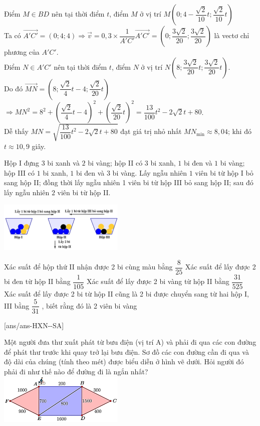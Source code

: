 \begin{ex}
{\begin{itemchoice}
     Điểm $M\in BD$ nên tại thời điểm $t$, điểm $M$ ở vị trí $M\left( 0;4-\dfrac{\sqrt{2}}{10}t;\dfrac{\sqrt{2}}{10}t \right)$\\
     Ta có $\vec{A'C'}=(0;4;4)\Rightarrow \vec{v}=0{,}3\times \dfrac{1}{A'C'}\vec{A'C'}=\left(0;\dfrac{3\sqrt{2}}{20};\dfrac{3\sqrt{2}}{20}\right)$ là vectơ chỉ phương của $A'C'$.\\
     Điểm $N\in A'C'$ nên tại thời điểm $t$, điểm $N$ ở vị trí $N\left(8;\dfrac{3\sqrt{2}}{20}t;\dfrac{3\sqrt{2}}{20}t\right)$.\\
     Do đó $\vec{MN}=\left(8;\dfrac{\sqrt{2}}{4}t-4;\dfrac{\sqrt{2}}{20}t\right)$\\
     $\Rightarrow MN^2=8^2+\left(\dfrac{\sqrt{2}}{4}t-4\right)^2+\left(\dfrac{\sqrt{2}}{20}t\right)^2=\dfrac{13}{100}t^2-2\sqrt{2}t+80$.\\
     Dễ thấy $MN=\sqrt{\dfrac{13}{100}t^2-2\sqrt{2}t+80}$ đạt giá trị nhỏ nhất $MN_{\min }\approx 8{,}04$; khi đó $t\approx 10{,}9$  giây.
     \end{itemchoice}
 }
\end{ex}
\begin{ex}%
Hộp I đựng $3$ bi xanh và $2$ bi vàng; hộp II có $3$ bi xanh, $1$ bi đen và $1$ bi vàng; hộp III có $1$ bi xanh, $1$ bi đen và $3$ bi vàng. Lấy ngẫu nhiên $1$ viên bi từ hộp I bỏ sang hộp II; đồng thời lấy ngẫu nhiên 1 viên bi từ hộp III bỏ sang hộp II; sau đó lấy ngẫu nhiên $2$ viên bi từ hộp II.\\
\centerline{
\includegraphics[width=6cm]{img/HXN-8-16}
}
 \choiceTF
 {Xác suất để hộp thứ II nhận được 2 bi cùng màu bằng $\dfrac{8}{25}$}
 {\True Xác suất để lấy được 2 bi đen từ hộp II bằng $\dfrac{1}{105}$}
 {\True Xác suất để lấy được 2 bi vàng từ hộp II bằng $\dfrac{31}{525}$}
 {Xác suất để lấy được 2 bi từ hộp II cũng là 2 bi được chuyển sang từ hai hộp I, III bằng $\dfrac{5}{31}$ , biết rằng đó là 2 viên bi vàng}
\end{ex}
\caukq
{}[ans/ans-HXN-\sode-SA]
\begin{ex}%
 \immini
 {
     Một người đưa thư xuất phát từ bưu điện (vị trí A) và phải đi qua các con đường để phát thư trước khi quay trở lại bưu điện. Sơ đồ các con đường cần đi qua và độ dài của chúng (tính theo mét) được biểu diễn ở hình vẽ dưới. Hỏi người đó phải đi như thế nào để đường đi là ngắn nhất?
 }
 {
     \includegraphics[width=6cm]{img/HXN-8-17}
 }
 \end{ex}
